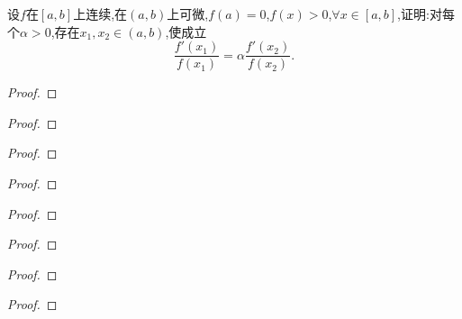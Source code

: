 \documentclass[lang=cn,newtx,10pt,scheme=chinese]{../Template/elegantbook}
\begin{document}
\begin{exercise}
    设\(f\)在\([a,b]\)上连续,在\((a,b)\)上可微,\(f(a)=0\),\(f(x)>0\),\(\forall x\in[a,b]\),证明:对每个\(\alpha>0\),存在\(x_1,x_2\in(a,b)\),使成立
    \[
    \frac{f'(x_1)}{f(x_1)}=\alpha\frac{f'(x_2)}{f(x_2)}.
    \]
\end{exercise}
\begin{proof}
    

\end{proof}

\begin{exercise}

\end{exercise}
\begin{proof}
    

\end{proof}

\begin{exercise}

\end{exercise}
\begin{proof}
    

\end{proof}

\begin{exercise}

\end{exercise}
\begin{proof}
    

\end{proof}

\begin{exercise}

\end{exercise}
\begin{proof}
    

\end{proof}

\begin{exercise}

\end{exercise}
\begin{proof}
    

\end{proof}

\begin{exercise}

\end{exercise}
\begin{proof}
    

\end{proof}

\begin{exercise}

\end{exercise}
\begin{proof}
    

\end{proof}
\end{document}
